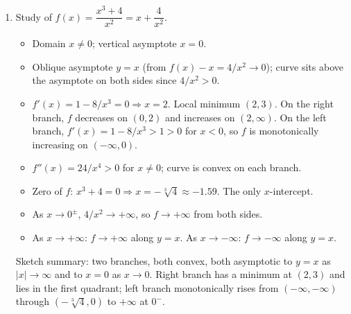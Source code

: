 \documentclass[12pt, twoside]{article}
\begin{document}
\begin{enumerate}[itemsep=0.3cm]
\begin{enumerate}[label=(\alph*), itemsep=0.3cm]
  Line $t$: $y=-7x+12$, slope $-7$, value at $x=1$ is $5$. So
  $P=(1,5)$.

  Conditions for tangency at $P$:
  \begin{itemize}
    \item $P$ on the graph: $f_{a,b}(1)=a+b=5$.
    \item Slopes match: $f_{a,b}'(1)=a-2b=-7$.
  \end{itemize}
  Subtracting: $3b=12\Rightarrow b=4$; then $a=1$.

  \textbf{$a=1,\ b=4$.}

  \item Study of $f(x)=\dfrac{x^3+4}{x^2}=x+\dfrac{4}{x^2}$.

  \begin{itemize}
    \item Domain $x\ne 0$; vertical asymptote $x=0$.
    \item Oblique asymptote $y=x$ (from $f(x)-x=4/x^2\to 0$); curve sits
    above the asymptote on both sides since $4/x^2>0$.
    \item $f'(x)=1-8/x^3=0\Rightarrow x=2$. Local minimum $(2,3)$.
    On the right branch, $f$ decreases on $(0,2)$ and increases on $(2,\infty)$.
    On the left branch, $f'(x)=1-8/x^3>1>0$ for $x<0$, so $f$ is monotonically
    increasing on $(-\infty,0)$.
    \item $f''(x)=24/x^4>0$ for $x\ne 0$; curve is convex on each branch.
    \item Zero of $f$: $x^3+4=0\Rightarrow x=-\sqrt[3]{4}\approx-1.59$. The
    only $x$-intercept.
    \item As $x\to 0^\pm$, $4/x^2\to+\infty$, so $f\to+\infty$ from both sides.
    \item As $x\to+\infty$: $f\to+\infty$ along $y=x$.
    As $x\to-\infty$: $f\to-\infty$ along $y=x$.
  \end{itemize}

  Sketch summary: two branches, both convex, both asymptotic to $y=x$ as
  $|x|\to\infty$ and to $x=0$ as $x\to 0$. Right branch has a minimum at
  $(2,3)$ and lies in the first quadrant; left branch monotonically rises
  from $(-\infty,-\infty)$ through $(-\sqrt[3]{4},0)$ to $+\infty$ at $0^-$.
\end{enumerate}

\end{enumerate}
\end{document}
